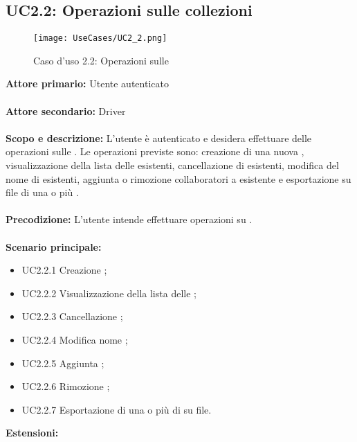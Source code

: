 \documentclass{scalatekids-article}
\begin{document}
\subsection{UC2.2: Operazioni sulle collezioni}

\begin{figure}[H]
  \begin{center}
    \texttt{[image: UseCases/UC2\_2.png]}
    \caption*{Caso d'uso 2.2: Operazioni sulle }
  \end{center}
\end{figure}
\textbf{Attore primario:} Utente autenticato\\ \\
\textbf{Attore secondario:} Driver\\ \\
\textbf{Scopo e descrizione:} L'utente è autenticato e desidera effettuare delle operazioni sulle . Le operazioni previste sono:
creazione di una nuova , visualizzazione della lista delle  esistenti, cancellazione di  esistenti, modifica del nome di  esistenti,
aggiunta o rimozione collaboratori a  esistente e esportazione su file di una o più .\\ \\
\textbf{Precodizione:} L'utente intende effettuare operazioni su .\\ \\
\textbf{Scenario principale:}
\begin{itemize}
\item UC2.2.1 Creazione ;
\item UC2.2.2 Visualizzazione della lista delle ;
\item UC2.2.3 Cancellazione ;
\item UC2.2.4 Modifica nome ;
\item UC2.2.5 Aggiunta ;
\item UC2.2.6 Rimozione ;
\item UC2.2.7 Esportazione di una o più di  su file.
\end{itemize}
\textbf{Estensioni:}
\end{document}
